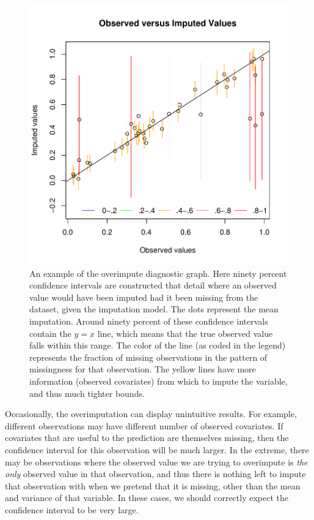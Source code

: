 \documentclass[12pt,titlepage]{article}
\begin{document}
\begin{figure}[htp!]
  \centering \includegraphics[scale=.8]{overimp}
  \caption{ An example of the overimpute diagnostic graph.  Here
    ninety percent confidence intervals are constructed that detail
    where an observed value would have been imputed had it been
    missing from the dataset, given the imputation model.  The dots
    represent the mean imputation.  Around ninety percent of these
    confidence intervals contain the $y=x$ line, which means that the
    true observed value falls within this range.  The color of the
    line (as coded in the legend) represents the fraction of missing
    observations in the pattern of missingness for that observation.
    The yellow lines have more information (observed covariates) from
    which to impute the variable, and thus much tighter bounds.}
  \label{f:oi}
\end{figure}
Occasionally, the overimputation can display unintuitive results.  For
example, different observations may have different number of observed
covariates.  If covariates that are useful to the prediction are
themselves missing, then the confidence interval for this observation
will be much larger.  In the extreme, there may be observations where
the observed value we are trying to overimpute is \emph{the only}
observed value in that observation, and thus there is nothing left to
impute that observation with when we pretend that it is missing, other
than the mean and variance of that variable.  In these cases, we
should correctly expect the confidence interval to be very large.
\end{document}
